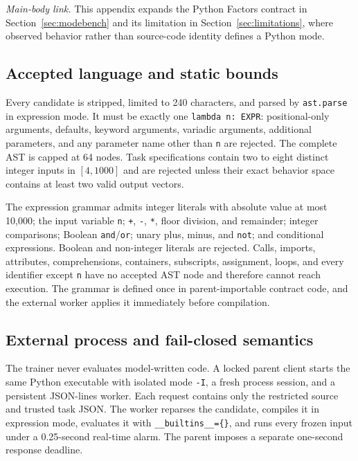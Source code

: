 \noindent\emph{Main-body link.} This appendix expands the Python Factors
contract in Section~\ref{sec:modebench} and its limitation in
Section~\ref{sec:limitations}, where observed behavior rather than source-code
identity defines a Python mode.

\subsection{Accepted language and static bounds}
\label{app:python-language}

Every candidate is stripped, limited to 240 characters, and parsed by
\texttt{ast.parse} in expression mode. It must be exactly one
\texttt{lambda n: EXPR}: positional-only arguments, defaults, keyword
arguments, variadic arguments, additional parameters, and any parameter name
other than \texttt{n} are rejected. The complete AST is capped at 64 nodes.
Task specifications contain two to eight distinct integer inputs in
$[4,1000]$ and are rejected unless their exact behavior space contains at
least two valid output vectors.

The expression grammar admits integer literals with absolute value at most
10,000; the input variable \texttt{n}; \texttt{+}, \texttt{-},
\texttt{*}, floor division, and remainder; integer comparisons; Boolean
\texttt{and}/\texttt{or}; unary plus, minus, and \texttt{not}; and conditional
expressions. Boolean and non-integer literals are rejected. Calls, imports,
attributes, comprehensions, containers, subscripts, assignment, loops, and
every identifier except \texttt{n} have no accepted AST node and therefore
cannot reach execution. The grammar is defined once in parent-importable
contract code, and the external worker applies it immediately before
compilation.

\subsection{External process and fail-closed semantics}
\label{app:python-process}

The trainer never evaluates model-written code. A locked parent client starts
the same Python executable with isolated mode \texttt{-I}, a fresh process
session, and a persistent JSON-lines worker. Each request contains only the
restricted source and trusted task JSON. The worker reparses the candidate,
compiles it in expression mode, evaluates it with
\texttt{\_\_builtins\_\_=\{\}}, and runs every frozen input under a
0.25-second real-time alarm. The parent imposes a separate one-second response
deadline.

